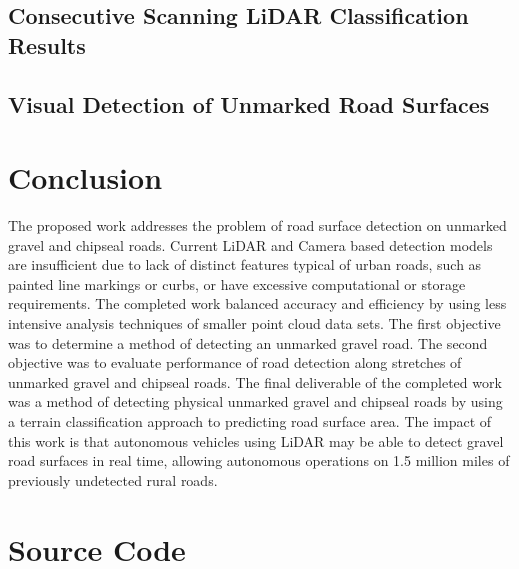 \documentclass[numbered,pdftex]{ohio-etd}
\begin{document}
{{		%
		
	
	\section{Consecutive Scanning LiDAR Classification Results}
	
	
	
	\section{Visual Detection of Unmarked Road Surfaces}
	
	
	
		
} %


\chapter{Conclusion}
{
	
	{The proposed work addresses the problem of road surface detection on unmarked gravel and chipseal roads. Current LiDAR and Camera based detection models are insufficient due to lack of distinct features typical of urban roads, such as painted line markings or curbs, or have excessive computational or storage requirements. The completed work balanced accuracy and efficiency by using less intensive analysis techniques of smaller point cloud data sets. The first objective was to determine a method of detecting an unmarked gravel road. The second objective was to evaluate performance of road detection along stretches of unmarked gravel and chipseal roads. The final deliverable of the completed work was a method of detecting physical unmarked gravel and chipseal roads by using a terrain classification approach to predicting road surface area. The impact of this work is that autonomous vehicles using LiDAR may be able to detect gravel road surfaces in real time, allowing autonomous operations on 1.5 million miles of previously undetected rural roads.}

}


\appendix

\chapter{Source Code}{
	
}}
\end{document}
